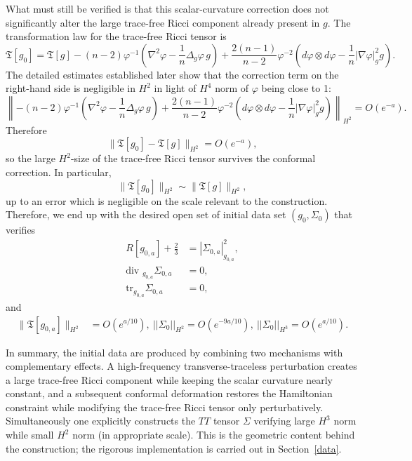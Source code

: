 \documentclass{amsart}
\renewcommand{\div}{\mbox{div }}
\newcommand{\tr}{\mbox{tr}}
\begin{document}
\noindent What must still be verified is that this scalar-curvature correction does not significantly alter the large trace-free Ricci component already present in $g$. The transformation law for the trace-free Ricci tensor is
\[
\mathfrak{T}[g_{0}]
=
\mathfrak{T}[g]
-(n-2)\varphi^{-1}
\left(
\nabla^{2}\varphi-\frac1n\Delta_{g}\varphi\,g
\right)
+\frac{2(n-1)}{n-2}\varphi^{-2}
\left(
d\varphi\otimes d\varphi-\frac1n|\nabla\varphi|_{g}^{2}g
\right).
\]
The detailed estimates established later show that the correction term on the right-hand side is negligible in $H^{2}$ in light of $H^{4}$ norm of $\varphi$ being close to 1:
\[
\left\|
-(n-2)\varphi^{-1}
\left(
\nabla^{2}\varphi-\frac1n\Delta_{g}\varphi\,g
\right)
+\frac{2(n-1)}{n-2}\varphi^{-2}
\left(
d\varphi\otimes d\varphi-\frac1n|\nabla\varphi|_{g}^{2}g
\right)
\right\|_{H^{2}}
=
O(e^{-a}).
\]
Therefore
\[
\|\mathfrak{T}[g_{0}]-\mathfrak{T}[g]\|_{H^{2}}=O(e^{-a}),
\]
so the large $H^{2}$-size of the trace-free Ricci tensor survives the conformal correction. In particular,
\[
\|\mathfrak{T}[g_{0}]\|_{H^{2}}
\sim
\|\mathfrak{T}[g]\|_{H^{2}},
\]
up to an error which is negligible on the scale relevant to the construction. Therefore, we end up with the desired open set of initial data set $(g_{0},\Sigma_{0})$ that verifies 
\begin{align*}
R[g_{0,a}]+\frac23&=|\Sigma_{0,a}|_{g_{0,a}}^{2},\\
\div_{g_{0,a}}\Sigma_{0,a}&=0,\\
\tr_{g_{0,a}}\Sigma_{0,a}&=0,
\end{align*}
and 
\begin{align*}
\|\mathfrak T[g_{0,a}]\|_{H^{2}}&=O(e^{a/10}),~||\Sigma_{0}||_{H^{2}}=O(e^{-9a/10}),~||\Sigma_{0}||_{H^{3}}=O(e^{a/10}).   
\end{align*}


\noindent In summary, the initial data are produced by combining two mechanisms with complementary effects. A high-frequency transverse-traceless perturbation creates a large trace-free Ricci component while keeping the scalar curvature nearly constant, and a subsequent conformal deformation restores the Hamiltonian constraint while modifying the trace-free Ricci tensor only perturbatively. Simultaneously one explicitly constructs the $TT$ tensor $\Sigma$ verifying large $H^{3}$ norm while small $H^{2}$ norm (in appropriate scale). This is the geometric content behind the construction; the rigorous implementation is carried out in Section~\ref{data}.
\end{document}
